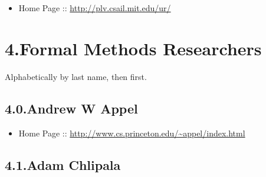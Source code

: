 \documentclass[12pt,twoside]{article}
\begin{document}
\begin{itemize}[noitemsep,topsep=\mdcompacttopsep]%

\item{}Home Page :: \href{http://plv.csail.mit.edu/ur/}{{\ttfamily http://\hspace{0pt}plv.\hspace{0pt}csail.\hspace{0pt}mit.\hspace{0pt}edu/\hspace{0pt}ur/\hspace{0pt}}}%
\end{itemize}%

\section{4.\hspace*{0.5em}Formal Methods Researchers}\label{sec-formal-methods-researchers}%

\noindent{}Alphabetically by last name, then first.%

\subsection{4.0.\hspace*{0.5em}Andrew W Appel}\label{sec-andrew-w-appel}%

\begin{itemize}[noitemsep,topsep=\mdcompacttopsep]%

\item{}Home Page :: \href{http://www.cs.princeton.edu/~appel/index.html}{{\ttfamily http://\hspace{0pt}www.\hspace{0pt}cs.\hspace{0pt}princeton.\hspace{0pt}edu/\hspace{0pt}\textasciitilde{}appel/\hspace{0pt}index.\hspace{0pt}html}}%
\end{itemize}%

\subsection{4.1.\hspace*{0.5em}Adam Chlipala}\label{sec-adam-chlipala}%
\end{document}
